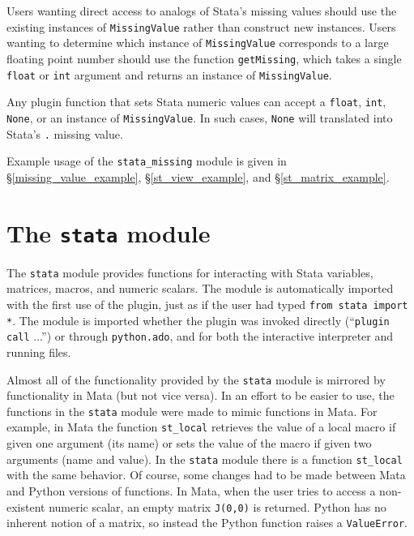 \documentclass{article}
\begin{document}
Users wanting direct access to analogs of Stata's missing values should use the existing instances of \lstinline$MissingValue$ rather than construct new instances. Users wanting to determine which instance of \lstinline$MissingValue$ corresponds to a large floating point number should use the function \lstinline$getMissing$, which takes a single \lstinline{float} or \lstinline{int} argument and returns an instance of \lstinline{MissingValue}. 
	
Any plugin function that sets Stata numeric values can accept a \lstinline{float}, \lstinline{int}, \lstinline$None$, or an instance of \lstinline{MissingValue}. In such cases, \lstinline$None$ will translated into Stata's \lstinline$.$ missing value.
	
Example usage of the \lstinline{stata_missing} module is given in \S\ref{missing_value_example}, \S\ref{st_view_example}, and \S\ref{st_matrix_example}.



\section{The \lstinline$stata$ module} \label{stata_module}
	
The \lstinline$stata$ module provides functions for interacting with Stata variables, matrices, macros, and numeric scalars. The module is automatically imported with the first use of the plugin, just as if the user had typed \lstinline$from stata import *$. The module is imported whether the plugin was invoked directly (``\lstinline$plugin call$ ...'') or through \lstinline$python.ado$, and for both the interactive interpreter and running files. 
			
Almost all of the functionality provided by the \lstinline$stata$ module is mirrored by functionality in Mata (but not vice versa). In an effort to be easier to use, the functions in the \lstinline$stata$ module were made to mimic functions in Mata. For example, in Mata the function \lstinline$st_local$ retrieves the value of a local macro if given one argument (its name) or sets the value of the macro if given two arguments (name and value). In the \lstinline$stata$ module there is a function \lstinline$st_local$ with the same behavior. Of course, some changes had to be made between Mata and Python versions of functions. In Mata, when the user tries to access a non-existent numeric scalar, an empty matrix \lstinline$J(0,0)$ is returned. Python has no inherent notion of a matrix, so instead the Python function raises a \lstinline{ValueError}.
			
\end{document}
